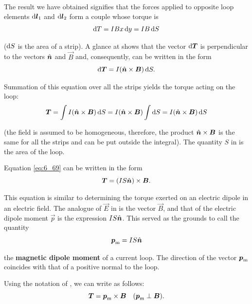 The result we have obtained signifies that the forces applied to opposite loop elements $\mathrm{d}\boldsymbol{l}_1$ and $\mathrm{d}\boldsymbol{l}_2$ form a
couple whose torque is
\begin{equation*}
    \mathrm{d} T = I B x\, \mathrm{d} y = I B\, \mathrm{d} S
\end{equation*}

\noindent
($\mathrm{d} S$ is the area of a strip). A glance at  shows that the vector $\mathrm{d}\boldsymbol{T}$ is perpendicular to the vectors $\hat{\boldsymbol{n}}$ and $\vec{B}$ and, consequently, can be written in the form
\begin{equation*}
    \mathrm{d}\boldsymbol{T} = I (\hat{\boldsymbol{n}} \times \boldsymbol{B})\, \mathrm{d} S.
\end{equation*}

\noindent
Summation of this equation over all the strips yields the torque acting on the loop:
\begin{equation}\label{eq:6_69}
    \boldsymbol{T} = \int I (\hat{\boldsymbol{n}} \times \boldsymbol{B})\, \mathrm{d} S = I (\hat{\boldsymbol{n}} \times \boldsymbol{B}) \int \mathrm{d} S = I (\hat{\boldsymbol{n}} \times \boldsymbol{B})\, \mathrm{d} S
\end{equation}

\noindent
(the field is assumed to be homogeneous, therefore, the product $\hat{\boldsymbol{n}}\times\boldsymbol{B}$ is the same for all the strips and can be put outside the integral). The quantity $S$ in  is the area of the loop.

Equation \eqref{eq:6_69} can be written in the form
\begin{equation}\label{eq:6_70}
    \boldsymbol{T} = (I S \hat{\boldsymbol{n}}) \times \boldsymbol{B}.
\end{equation}

\noindent
This equation is similar to  determining the torque exerted on an electric dipole in an electric field. The analogue of $\vec{E}$ in  is the vector $\vec{B}$, and that of the electric dipole moment $\vec{p}$ is the expression $IS\hat{\boldsymbol{n}}$. This served as the grounds to call the quantity
\begin{equation}\label{eq:6_71}
    \boldsymbol{p}_{\text{m}} = I S \hat{\boldsymbol{n}}
\end{equation}

\noindent
the \textbf{magnetic dipole moment} of a current loop. The direction of the vector $\boldsymbol{p}_{\text{m}}$ coincides with that of a positive normal to the loop.

Using the notation of , we can write  as follows:
\begin{equation}\label{eq:6_72}
    \boldsymbol{T} = \boldsymbol{p}_{\text{m}} \times \boldsymbol{B}\quad (\boldsymbol{p}_{\text{m}} \perp \boldsymbol{B}).
\end{equation}

